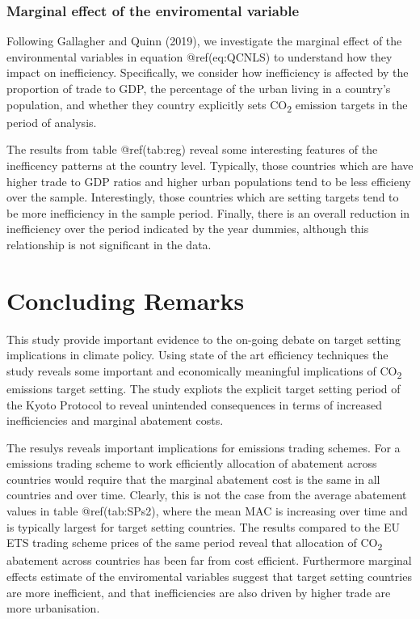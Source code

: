 \documentclass[
  10pt,
]{article}
\begin{document}
\hypertarget{marginal-effect-of-the-enviromental-variable}{%
\subsubsection{Marginal effect of the enviromental
variable}\label{marginal-effect-of-the-enviromental-variable}}

Following Gallagher and Quinn (2019), we investigate the marginal effect
of the environmental variables in equation @ref(eq:QCNLS) to understand
how they impact on inefficiency. Specifically, we consider how
inefficiency is affected by the proportion of trade to GDP, the
percentage of the urban living in a country's population, and whether
they country explicitly sets CO\textsubscript{2} emission targets in the
period of analysis.

The results from table @ref(tab:reg) reveal some interesting features of
the inefficency patterns at the country level. Typically, those
countries which are have higher trade to GDP ratios and higher urban
populations tend to be less efficieny over the sample. Interestingly,
those countries which are setting targets tend to be more inefficiency
in the sample period. Finally, there is an overall reduction in
inefficiency over the period indicated by the year dummies, although
this relationship is not significant in the data.

\hypertarget{concluding-remarks}{%
\section{Concluding Remarks}\label{concluding-remarks}}

This study provide important evidence to the on-going debate on target
setting implications in climate policy. Using state of the art
efficiency techniques the study reveals some important and economically
meaningful implications of CO\textsubscript{2} emissions target setting.
The study expliots the explicit target setting period of the Kyoto
Protocol to reveal unintended consequences in terms of increased
inefficiencies and marginal abatement costs.

The resulys reveals important implications for emissions trading
schemes. For a emissions trading scheme to work efficiently allocation
of abatement across countries would require that the marginal abatement
cost is the same in all countries and over time. Clearly, this is not
the case from the average abatement values in table @ref(tab:SPs2),
where the mean MAC is increasing over time and is typically largest for
target setting countries. The results compared to the EU ETS trading
scheme prices of the same period reveal that allocation of
CO\textsubscript{2} abatement across countries has been far from cost
efficient. Furthermore marginal effects estimate of the enviromental
variables suggest that target setting countries are more inefficient,
and that inefficiencies are also driven by higher trade are more
urbanisation.
\end{document}
